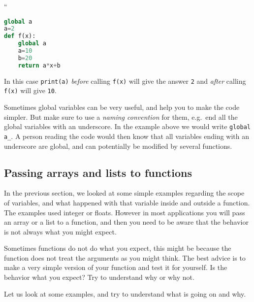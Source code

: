 \documentclass[graybox,sectrefs,envcountresetchap,open=right,final]{svmonodo}
\newenvironment{graybox2admon}[1][]{
\begin{graybox2mdframed}[frametitle=#1]
}
{
\end{graybox2mdframed}
}
\begin{document}
``









\begin{lstlisting}[language=python,style=blue1bar]
global a
a=2
def f(x):
    global a
    a=10
    b=20
    return a*x+b

\end{lstlisting}

In this case \texttt{print(a)} \emph{before} calling \texttt{f(x)} will give the answer \texttt{2} and \emph{after} calling \texttt{f(x)} will give \texttt{10}.



\begin{graybox2admon}[Use of global variables]
Sometimes global variables can be very useful, and help you to make the code simpler. But make sure to use a \emph{naming convention}  for them, e.g.~end all the global variables with an underscore. In the example above we would write \Verb!global a_!. A person reading the code would then know that all variables ending with an underscore are global, and can potentially be modified by several functions.
\end{graybox2admon}




\subsection{Passing arrays and lists to functions}
In the previous section, we looked at some simple examples regarding the scope of variables, and what happened with that variable inside and outside a function. The examples used integer or floats. However in most applications you will pass an array or a list to a function, and then you need to be aware that the behavior is not always what you might expect.


\begin{graybox2admon}[Unexpected behavior]
Sometimes functions do not do what you expect, this might be because the function does not treat  the arguments as you might think. The best advice is to make a very simple version of your function and test it for yourself. Is the behavior what you expect? Try to understand why or why not.
\end{graybox2admon}



Let us look at some examples, and try to understand what is going on and why.
\end{document}
